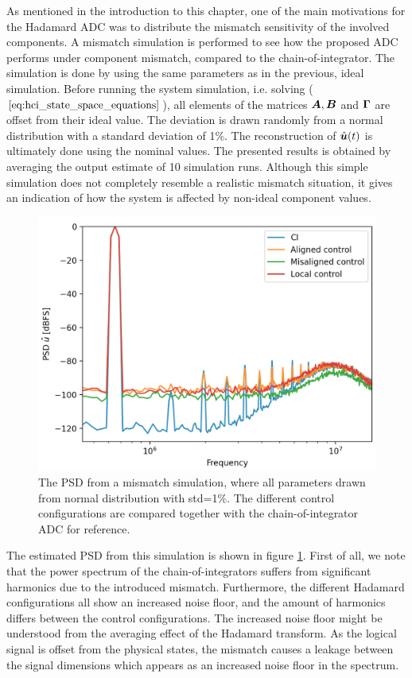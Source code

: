 As mentioned in the introduction to this chapter, one of the main motivations for the Hadamard ADC was to distribute the mismatch sensitivity of the involved components. A mismatch simulation is performed to see how the proposed ADC performs under component mismatch, compared to the chain-of-integrator. The simulation is done by using the same parameters as in the previous, ideal simulation. Before running the system simulation, i.e. solving ($\ref{eq:hci_state_space_equations}$), all elements of the matrices $\bm{A}, \bm{B}$ and $\bm{\Gamma}$ are offset from their ideal value. The deviation is drawn randomly from a normal distribution with a standard deviation of 1\%. The reconstruction of $\hat{\bm{u}}(t)$ is ultimately done using the nominal values. The presented results is obtained by averaging the output estimate of 10 simulation runs. Although this simple simulation does not completely resemble a realistic mismatch situation, it gives an indication of how the system is affected by non-ideal component values.

\begin{figure}[htbp]
    \centering
    \includegraphics[width=\linewidth]{figures/05hadamard/mismatch_sim.png}
    \caption{The PSD from a mismatch simulation, where all parameters drawn from normal distribution with std=1\%. The different control configurations are compared together with the chain-of-integrator ADC for reference.}
    \label{fig:hci_mismatch_sim}
\end{figure}

The estimated PSD from this simulation is shown in figure \ref{fig:hci_mismatch_sim}. First of all, we note that the power spectrum of the chain-of-integrators suffers from significant harmonics due to the introduced mismatch. Furthermore, the different Hadamard configurations all show an increased noise floor, and the amount of harmonics differs between the control configurations. The increased noise floor might be understood from the averaging effect of the Hadamard transform. As the logical signal is offset from the physical states, the mismatch causes a leakage between the signal dimensions which appears as an increased noise floor in the spectrum.

